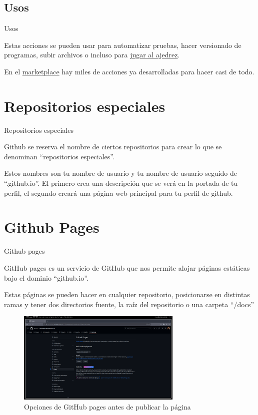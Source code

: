 \documentclass{beamer}
\begin{document}
\subsection{Usos}
\begin{frame}{Usos}

    Estas acciones se pueden usar para automatizar pruebas, hacer versionado de programas, subir archivos o incluso para \href{https://github.com/marcizhu/marcizhu}{jugar al ajedrez}.

    En el \href{https://github.com/marketplace?type=actions}{marketplace} hay miles de acciones ya desarrolladas para hacer casi de todo.

\end{frame}

\section{Repositorios especiales}
\begin{frame}{Repositorios especiales}

    Github se reserva el nombre de ciertos repositorios para crear lo que se denominan ``repositorios especiales''.

    Estos nombres son tu nombre de usuario y tu nombre de usuario seguido de ``.github.io''. El primero crea una descripción que se verá en la portada de tu perfil, el segundo creará una página web principal para tu perfil de github.

\end{frame}
\section{Github Pages}
\begin{frame}{Github pages}

    GitHub pages es un servicio de GitHub que nos permite alojar páginas estáticas bajo el dominio ``github.io''.

    Estas páginas se pueden hacer en cualquier repositorio, posicionarse en distintas ramas y tener dos directorios fuente, la raíz del repositorio o una carpeta ``/docs''

\end{frame}
\begin{frame}

    \begin{figure}[H]
        \centering
        \includegraphics[width=0.7\textwidth]{../Images/github_pages.png}
        \caption{Opciones de GitHub pages antes de publicar la página}
    \end{figure}

\end{frame}
\end{document}
